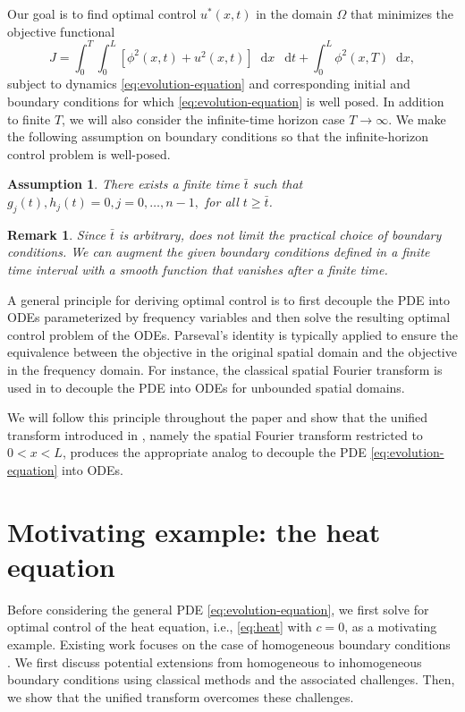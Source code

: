 \documentclass[journal,twoside,web]{ieeecolor}
\newtheorem{assumption}{Assumption}
\newtheorem{remark}{Remark}
\newcommand{\state}{\phi}
\newcommand*\diff{\mathop{}\!\mathrm{d}}
\begin{document}
Our goal is to find optimal control $u^*(x,t)$ in the domain $\Omega$ that minimizes the objective functional 
\begin{equation}\label{eq:obj-half}
	J = \int_0^T \int_{0}^{L}\left[\state^2(x,t)+u^2(x,t)\right]\diff x\ \diff t  + \int_0^L\state^2(x,T)\diff x,
\end{equation}
subject to dynamics \eqref{eq:evolution-equation} and corresponding initial and boundary conditions for which \eqref{eq:evolution-equation} is well posed. 
In addition to finite $T$, we will also consider the infinite-time horizon case $T\to\infty$.
We make the following assumption on boundary conditions so that the infinite-horizon control problem is well-posed.
\begin{assumption}\label{assumption:boundary-conditions-infinite}
	There exists a finite time $\bar{t}$ such that $g_j(t),h_j(t)=0,j=0,\ldots,n-1,$ for all $t\geq\bar{t}$.
\end{assumption}
\begin{remark}
	Since $\bar{t}$ is arbitrary,
	 does not limit the practical choice of boundary conditions. We can augment the given boundary conditions defined in a finite time interval with a smooth function that vanishes after a finite time.
\end{remark}

A general principle for deriving optimal control is to first decouple the PDE into ODEs parameterized by frequency variables and then solve the resulting optimal control problem of the ODEs. 
Parseval's identity is typically applied to ensure the equivalence between the objective in the original spatial domain and the objective in the frequency domain.
For instance, the classical spatial Fourier transform is used in \cite{bamieh2002distributed} to decouple the PDE into ODEs for unbounded spatial domains.

We will follow this principle throughout the paper and show that the unified transform introduced in \cite{fokas2008unified}, namely the spatial Fourier transform restricted to $0<x<L$, produces the appropriate analog to decouple the PDE \eqref{eq:evolution-equation} into ODEs.

\section{Motivating example: the heat equation}
Before considering the general PDE \eqref{eq:evolution-equation}, we first solve for optimal control of the heat equation, i.e., \eqref{eq:heat} with $c=0$, as a motivating example.
Existing work focuses on the case of homogeneous boundary conditions \cite{epperlein2016spatially}. 
We first discuss potential extensions from homogeneous to inhomogeneous boundary conditions using classical methods and the associated challenges.
Then, we show that the unified transform overcomes these challenges.
\end{document}
